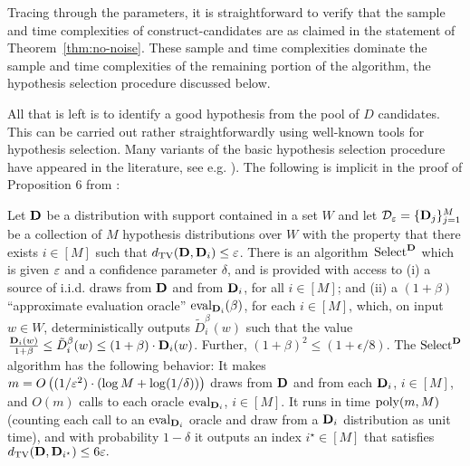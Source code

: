Tracing through the parameters, it is straightforward to verify that the sample and time complexities of \textsf{construct-candidates} are as claimed in the statement of Theorem~\ref{thm:no-noise}. These sample and time complexities dominate the sample and time complexities of the remaining portion of the algorithm, the hypothesis selection procedure discussed below.



All that is left is to identify a good hypothesis from the pool of $D$ candidates.   This can be carried out rather straightforwardly using well-known tools for hypothesis selection.  Many variants of the basic hypothesis selection procedure have appeared in the literature, see e.g.
\citep{Yatracos85,DaskalakisKamath14,AJOS14,DDS12stoc,DDS15}).  
The following is implicit in the proof of
Proposition 6 from \citep{DDS15}:

\begin{proposition} \label{prop:log-cover-size}
Let $\mathbf{D}$ be a distribution
with support contained in a
set $W$
and let $\mathcal{D}_\varepsilon = \{ \mathbf{D}_j\}_{j=1}^M$ be a collection of $M$ hypothesis distributions 
over $W$ with the property that there exists $i \in [M]$ such that
$d_\mathrm{TV}(\mathbf{D},\mathbf{D}_i) \leq \varepsilon$.
There is an algorithm~$\mathrm{Select}^{\mathbf{D}}$ which is given
$\varepsilon$ and a confidence parameter $\delta$, and is provided
with access to
(i) a source of i.i.d. draws from $\mathbf{D}$ and from $\mathbf{D}_i$, for all $i \in [M]$;
and
(ii) a $(1+\beta)$ ``approximate evaluation oracle'' $\mathrm{eval}_{\mathbf{D}_i}(\beta)$,
for each $i \in [M]$, which, on input $w \in W$, deterministically outputs $\tilde{D}_i^{\beta}(w)$ such that 
the value $\frac{\mathbf{D}_i(w)}{1+\beta} \le \tilde{D}_i^{\beta}(w) \le (1+\beta) \cdot \mathbf{D}_i(w)$. 
Further, $(1+\beta)^2 \le (1+\epsilon/8)$. 
 The $\mathrm{Select}^{\mathbf{D}}$ algorithm has the following behavior:
It makes
$m = O\left( (1/ \varepsilon^{2}) \cdot (\log M + \log(1/\delta)) \right)
$ draws from $\mathbf{D}$ and {from} each $\mathbf{D}_i$, $i \in [M]$,
and $O(m)$ calls to each oracle $\mathrm{eval}_{\mathbf{D}_i}$, $i \in [M]$.  It runs in time $\mathrm{poly}(m,M)$ (counting each call to an $\mathrm{eval}_{\mathbf{D}_i}$ oracle and draw from a $\mathbf{D}_i$ distribution as unit time),
and with probability $1-\delta$ it outputs an index $i^{\star} \in [M]$ that satisfies $d_\mathrm{TV}(\mathbf{D},\mathbf{D}_{i^{\star}}) \leq 6\varepsilon.$
\end{proposition}

